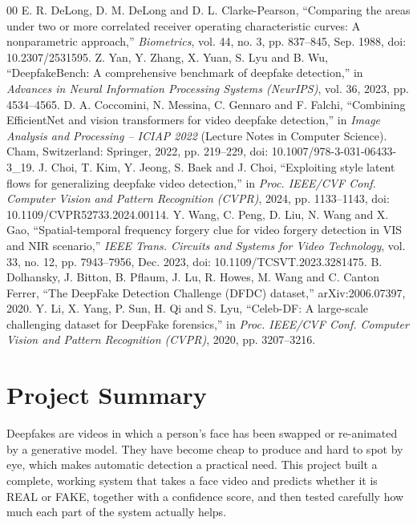 \documentclass[conference]{IEEEtran}
\begin{document}
\begin{thebibliography}{00}
 E. R. DeLong, D. M. DeLong and D. L. Clarke-Pearson, ``Comparing the areas under two or more correlated receiver operating characteristic curves: A nonparametric approach,'' \textit{Biometrics}, vol. 44, no. 3, pp. 837--845, Sep. 1988, doi: 10.2307/2531595.
 Z. Yan, Y. Zhang, X. Yuan, S. Lyu and B. Wu, ``DeepfakeBench: A comprehensive benchmark of deepfake detection,'' in \textit{Advances in Neural Information Processing Systems (NeurIPS)}, vol. 36, 2023, pp. 4534--4565.
 D. A. Coccomini, N. Messina, C. Gennaro and F. Falchi, ``Combining EfficientNet and vision transformers for video deepfake detection,'' in \textit{Image Analysis and Processing -- ICIAP 2022} (Lecture Notes in Computer Science). Cham, Switzerland: Springer, 2022, pp. 219--229, doi: 10.1007/978-3-031-06433-3\_19.
 J. Choi, T. Kim, Y. Jeong, S. Baek and J. Choi, ``Exploiting style latent flows for generalizing deepfake video detection,'' in \textit{Proc. IEEE/CVF Conf. Computer Vision and Pattern Recognition (CVPR)}, 2024, pp. 1133--1143, doi: 10.1109/CVPR52733.2024.00114.
 Y. Wang, C. Peng, D. Liu, N. Wang and X. Gao, ``Spatial-temporal frequency forgery clue for video forgery detection in VIS and NIR scenario,'' \textit{IEEE Trans. Circuits and Systems for Video Technology}, vol. 33, no. 12, pp. 7943--7956, Dec. 2023, doi: 10.1109/TCSVT.2023.3281475.
 B. Dolhansky, J. Bitton, B. Pflaum, J. Lu, R. Howes, M. Wang and C. Canton Ferrer, ``The DeepFake Detection Challenge (DFDC) dataset,'' arXiv:2006.07397, 2020.
 Y. Li, X. Yang, P. Sun, H. Qi and S. Lyu, ``Celeb-DF: A large-scale challenging dataset for DeepFake forensics,'' in \textit{Proc. IEEE/CVF Conf. Computer Vision and Pattern Recognition (CVPR)}, 2020, pp. 3207--3216.
\end{thebibliography}

\onecolumn
\section*{Project Summary}

Deepfakes are videos in which a person's face has been swapped or re-animated
by a generative model. They have become cheap to produce and hard to spot by
eye, which makes automatic detection a practical need. This project built a
complete, working system that takes a face video and predicts whether it is
REAL or FAKE, together with a confidence score, and then tested carefully how
much each part of the system actually helps.
\end{document}
